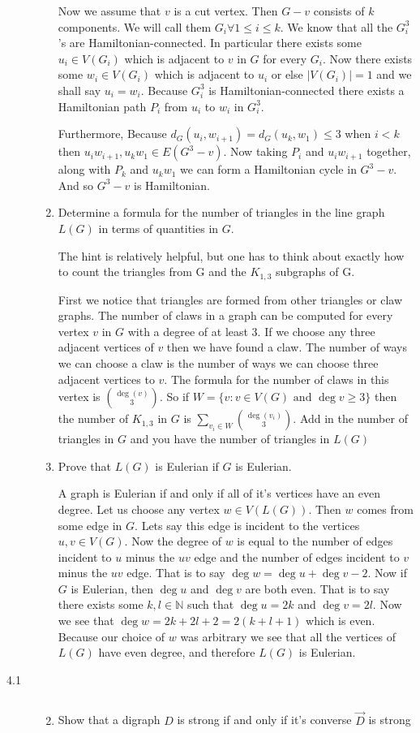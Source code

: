 \documentclass[letterpaper]{article}
\begin{document}
\begin{description}
\begin{enumerate}
Now we assume that $v$ is a cut vertex. Then $G-v$ consists of $k$ components. We will call them $G_i\forall 1\le i\le k$. We know that all the $G_i^3$'s are Hamiltonian-connected. In particular there exists some $u_i\in V(G_i)$ which is adjacent to $v$ in $G$ for every $G_i$. Now there exists some $w_i\in V(G_i)$ which is adjacent to $u_i$ or else $|V(G_i)|=1$ and we shall say $u_i=w_i$. Because $G_i^3$ is Hamiltonian-connected there exists a Hamiltonian path $P_i$ from $u_i$ to $w_i$ in $G_i^3$.

Furthermore, Because $d_G(u_i,w_{i+1})=d_G(u_k,w_1)\le 3$ when $i<k$ then $u_iw_{i+1}, u_kw_1\in E(G^3-v)$. Now taking $P_i$ and $u_iw_{i+1}$ together, along with $P_k$ and $u_kw_1$ we can form a Hamiltonian cycle in $G^3-v$. And so $G^3-v$ is Hamiltonian.

\item
Determine a formula for the number of triangles in the line graph $L(G)$ in terms of quantities in $G$.

The hint is relatively helpful, but one has to think about exactly how to count the triangles from G and the $K_{1,3}$ subgraphs of G.  

First we notice that triangles are formed from other triangles or claw graphs. The number of claws in a graph can be computed for every vertex $v$ in $G$ with a degree of at least 3. If we choose any three adjacent vertices of $v$ then we have found a claw. The number of ways we can choose a claw is the number of ways we can choose three adjacent vertices to $v$. The formula for the number of claws in this vertex is $\binom{\deg(v)}{3}$. So if $W=\{v:v\in V(G)\text{ and }\deg v\ge 3\}$ then the number of $K_{1,3}$ in $G$ is $\sum\limits_{v_i\in W}{\binom{\deg(v_i)}{3}}$. Add in the number of triangles in $G$ and you have the number of triangles in $L(G)$
\item
Prove that $L(G)$ is Eulerian if $G$ is Eulerian.

A graph is Eulerian if and only if all of it's vertices have an even degree. Let us choose any vertex $w\in V(L(G))$. Then $w$ comes from some edge in $G$. Lets say this edge is incident to the vertices $u,v\in V(G)$. Now the degree of $w$ is equal to the number of edges incident to $u$ minus the $uv$ edge and the number of edges incident to $v$ minus the $uv$ edge. That is to say $\deg w=\deg u+\deg v-2$. Now if $G$ is Eulerian, then $\deg u$ and $\deg v$ are both even. That is to say there exists some $k,l\in \mathbb{N}$ such that $\deg u=2k$ and $\deg v=2l$. Now we see that $\deg w=2k+2l+2=2(k+l+1)$ which is even. Because our choice of $w$ was arbitrary we see that all the vertices of $L(G)$ have even degree, and therefore $L(G)$ is Eulerian.
\end{enumerate}
\item[4.1]$\quad$
\begin{enumerate}
\setcounter{enumi}{1}
\item
Show that a digraph $D$ is strong if and only if it's converse $\overrightarrow{D}$ is strong


\end{enumerate}
\end{description}
\end{document}
